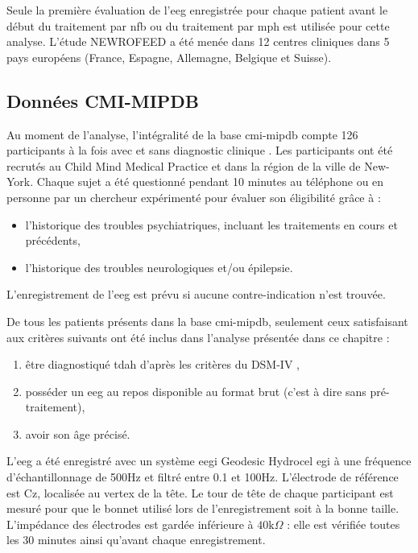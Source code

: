 Seule la première évaluation de l'\gls{eeg} enregistrée pour chaque patient avant le début du traitement par \gls{nfb} ou du traitement par \gls{mph} est utilisée pour cette analyse. 
L'étude NEWROFEED a été menée dans 12 centres cliniques dans 5 pays européens (France, Espagne, Allemagne, Belgique et Suisse).

\subsection{Données CMI-MIPDB}
Au moment de l'analyse, l'intégralité de la base \gls{cmi-mipdb} compte 126 participants à la fois avec et sans diagnostic clinique \citep{Langer2017, Langer2017b}.
Les participants ont été recrutés au Child Mind Medical Practice et dans la région de la ville de New-York. Chaque sujet a été questionné pendant 10 minutes
au téléphone ou en personne par un chercheur expérimenté pour évaluer son éligibilité grâce à :
\begin{itemize}
\item l'historique des troubles psychiatriques, incluant les traitements en cours et précédents,
\item l'historique des troubles neurologiques et/ou épilepsie.
\end{itemize}

L'enregistrement de l'\gls{eeg} est prévu si aucune contre-indication n'est trouvée. 

De tous les patients présents dans la base \gls{cmi-mipdb}, seulement ceux satisfaisant aux critères suivants ont été inclus dans l'analyse présentée dans ce chapitre :
\begin{enumerate}
\item être diagnostiqué \gls{tdah} d'après les critères du DSM-IV \citep{DSM-4},
\item posséder un \gls{eeg} au repos disponible au format brut (c'est à dire sans pré-traitement),
\item avoir son âge précisé.
\end{enumerate}

L'\gls{eeg} a été enregistré avec un système \gls{eegi} Geodesic Hydrocel \gls{egi} à une fréquence d'échantillonnage de 500Hz et filtré entre 0.1 et 100Hz. 
L'électrode de référence est Cz, localisée au vertex de la tête. Le tour de tête de chaque participant est mesuré pour que le bonnet utilisé lors de l'enregistrement 
soit à la bonne taille. L'impédance des électrodes est gardée inférieure à $40\text{k}\Omega$ : elle est vérifiée toutes les 30 minutes ainsi qu'avant chaque enregistrement.


